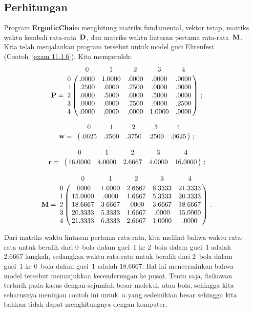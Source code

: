 \subsection*{Perhitungan}
Program {\bf ErgodicChain} menghitung matriks fundamental, vektor tetap, matriks
waktu kembali rata-rata~${\mbox{\bf D}\/}$, dan matriks waktu lintasan pertama
rata-rata~${\mbox{\bf M}\/}$. Kita telah menjalankan program tersebut untuk model guci
Ehrenfest (Contoh~\ref{exam 11.1.6}). 
Kita memperoleh:
$$
\mat {P} = \bordermatrix{
    &  0  & 1 & 2 & 3 & 4 \cr
  0 &   .0000 & 1.0000 &  .0000 &  .0000 &  .0000\cr
  1 &   .2500 & .0000  &  .7500 &  .0000 &  .0000\cr
  2 &   .0000 & .5000  &  .0000 &  .5000 &  .0000\cr
  3 &   .0000 & .0000  &  .7500 &  .0000 &  .2500\cr
  4 &   .0000 & .0000  &  .0000 &  1.0000&  .0000}\ ;
$$
 
$$
\mat {w} = \bordermatrix{
  &     0  &   1   &   2   &   3   &    4\cr
  & .0625  &.2500  &.3750  &.2500  &.0625}\ ;
$$

$$
\mat {r} = \bordermatrix{
  &       0  &      1  &      2 &       3 &       4\cr
  & 16.0000  & 4.0000  & 2.6667 &  4.0000 & 16.0000}\ ;
$$

$$
\mat {M} = \bordermatrix{
  &        0 &      1 &      2 &       3 &       4\cr
0 &    .0000 & 1.0000 & 2.6667 &  6.3333 & 21.3333\cr
1 &  15.0000 &  .0000 & 1.6667 &  5.3333 & 20.3333\cr
2 &  18.6667 & 3.6667 &  .0000 &  3.6667 & 18.6667\cr
3 &  20.3333 & 5.3333 & 1.6667 &   .0000 & 15.0000\cr
4 &  21.3333 & 6.3333 & 2.6667 &  1.0000 &   .0000}\ .
$$ 
\par
Dari matriks waktu lintasan pertama rata-rata, kita melihat bahwa waktu rata-rata
untuk beralih dari 0~bola dalam guci~1 ke 2~bola dalam guci~1 adalah 2.6667
langkah, sedangkan waktu rata-rata untuk beralih dari 2~bola dalam guci~1 ke
0~bola dalam guci~1 adalah 18.6667. Hal ini mencerminkan bahwa model tersebut
menunjukkan kecenderungan ke pusat. Tentu saja, fisikawan tertarik pada kasus
dengan sejumlah besar molekul, atau bola, sehingga kita seharusnya meninjau
contoh ini untuk~$n$ yang sedemikian besar sehingga kita bahkan tidak dapat
menghitungnya dengan komputer.

